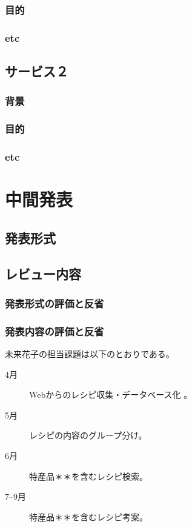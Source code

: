 \documentclass[openany,11pt,papersize]{jsbook}
\begin{document}
\subsection{目的}
\subsection{etc}

\section{サービス２}

\subsection{背景}
\subsection{目的}
\subsection{etc}

\chapter{中間発表}

\section{発表形式}
\section{レビュー内容}
\subsection{発表形式の評価と反省}
\subsection{発表内容の評価と反省}

未来花子の担当課題は以下のとおりである。 
\begin{description}
 \item[4月] Webからのレシピ収集・データベース化 。
 \item[5月] レシピの内容のグループ分け。
 \item[6月] 特産品＊＊を含むレシピ検索。
 \item[7--9月]特産品＊＊を含むレシピ考案。
\end{description}
\end{document}
